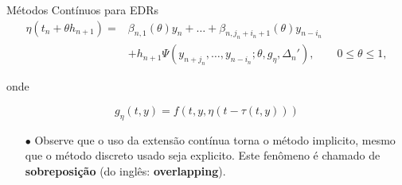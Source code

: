 \documentclass{beamer}
\theoremstyle{plain}
\theoremstyle{definition}
\begin{document}
\begin{frame}{Métodos Contínuos para EDRs}
    \begin{equation}
        \begin{split}
            \eta(t_n + \theta h_{n+1}) = &\beta_{n, 1} (\theta) y_{n} + \dots + \beta_{n, j_n + i_n + 1}(\theta) y_{n - i_n} \\
                                         &+ h_{n+1} \Psi(y_{n+j_n}, \dots, y_{n-i_n}; \theta, g_\eta, \Delta _n '), \qquad 0 \leq \theta \leq 1,
                                         \label{chap3:sec:2:def:eq:Interpolant_extension}
        \end{split}
    \end{equation}


    onde

    $$
    g_{\eta}(t, y)=f(t, y, \eta(t-\tau(t, y)))
    $$

    \begin{itemize}
        \item[$\bullet$] Observe que o uso da extensão contínua torna o método implicito, mesmo que o método discreto usado seja explicito. Este fenômeno é chamado de \textbf{sobreposição} (do inglês: \textbf{overlapping}).

    \end{itemize}

\end{frame}


\end{document}
